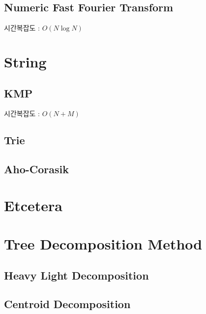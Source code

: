 \documentclass[10pt,landscape,a4paper,twocolumn]{article}
\begin{document}
\subsection{Numeric Fast Fourier Transform}
시간복잡도 : $O(N\log{N})$




\section{String}
\subsection{KMP}
시간복잡도 : $O(N+M)$


\subsection{Trie}


\subsection{Aho-Corasik}



\iffalse
\section{Etcetera}
\section{Tree Decomposition Method}
\subsection{Heavy Light Decomposition}
\subsection{Centroid Decomposition}
\end{document}
